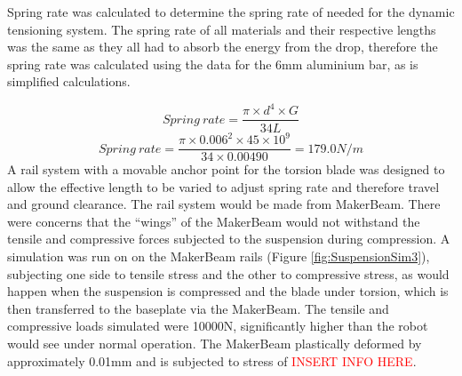 Spring rate was calculated to determine the spring rate of needed for the dynamic tensioning system. The spring rate of all materials and their respective lengths was the same as they all had to absorb the energy from the drop, therefore the spring rate was calculated using the data for the 6mm aluminium bar, as is simplified calculations.

\[Spring\:rate = \frac{\pi \times d^4 \times G}{34L}\]
\[Spring\: rate = \frac{\pi \times 0.006^2 \times 45\times10^{9}}{34\times 0.00490} = 179.0 N/m\]
A rail system with a movable anchor point for the torsion blade was designed to allow the effective length to be varied to adjust spring rate and therefore travel and ground clearance. The rail system would be made from MakerBeam. There were concerns that the “wings” of the MakerBeam would not withstand the tensile and compressive forces subjected to the suspension during compression. A simulation was run on on the MakerBeam rails (Figure \ref{fig:SuspensionSim3}), subjecting one side to tensile stress and the other to compressive stress, as would happen when the suspension is compressed and the blade under torsion, which is then transferred to the baseplate via the MakerBeam. The tensile and compressive loads simulated were 10000N, significantly higher than the robot would see under normal operation. The MakerBeam plastically deformed by approximately 0.01mm and is subjected to stress of \textcolor{red}{INSERT INFO HERE}.

